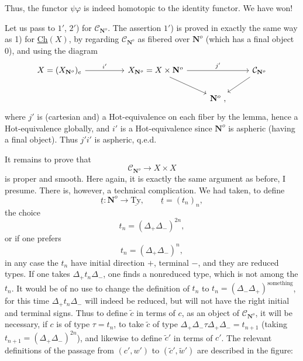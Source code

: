 \documentclass[11pt]{article}
\newcommand{\printedpage}[1]{\marginpar{\footnotesize p.~#1}}
\newcommand{\msp}[1]{\marginpar{\footnotesize [#1]}}
\newcommand{\CN}{\mathcal{C}_{\mathbf{N}^o}}
\begin{document}
\printedpage{104}
\msp{page 166}

Thus, the functor $\psi\varphi$ is indeed homotopic to the identity functor. We have won!

Let us pass to $1'$, $2'$) for $\CN$. The assertion $1'$) is proved in exactly the same way as 1) for \underline{Ch}$(X)$, by regarding $\CN$ as fibered over $\mathbf{N}^o$ (which has a final object 0), and using the diagram
\[
\begin{tikzcd}
X = (X_{\mathbf{N}^o})_e \arrow[rr, "i'"] & & X_{\mathbf{N}^o} = X \times \mathbf{N}^o \arrow[rr, "j'"] \arrow[dr] & & \mathcal{C}_{\mathbf{N}^o} \arrow[dl] \\
 & & & \mathbf{N}^o \ , &
\end{tikzcd}
\]
where $j'$ is (cartesian and) a Hot-equivalence on each fiber by the lemma, hence a Hot-equivalence globally, and $i'$ is a Hot-equivalence since $\mathbf{N}^o$ is aspheric (having a final object). Thus $j'i'$ is aspheric, q.e.d.

It remains to prove that
\[ \CN \longrightarrow X \times X \]
is proper and smooth. Here again,
\msp{page 167}
it is exactly the same argument as before, I presume. There is, however, a technical complication. We had taken, to define
\[ \underline{t} : \mathbf{N}^o \longrightarrow \underline{\mathrm{Ty}}, \qquad \underline{t} = (t_n)_n, \]
the choice
\[ t_n = (\Delta_+\Delta_-)^{2n}, \]
or if one prefers
\[ t_n = (\Delta_+\Delta_-)^n, \]
in any case the $t_n$ have initial direction $+$, terminal $-$, and they are reduced types. If one takes $\Delta_+t_n\Delta_-$, one finds a nonreduced type, which is not among the $t_n$. It would be of no use to change the definition of $t_n$ to $t_n = (\Delta_-\Delta_+)^{\text{something}}$, for this time $\Delta_+t_n\Delta_-$ will indeed be reduced, but will not have the right initial and terminal signs. Thus to define $\tilde{c}$ in terms of $c$, as an object of $\CN$, it will be necessary, if $c$ is of type $\tau = t_n$, to take $\tilde{c}$ of type $\Delta_+\Delta_-\tau\Delta_+\Delta_- = t_{n+1}$ (taking $t_{n+1} = (\Delta_+\Delta_-)^{2n}$), and likewise to define $\tilde{c}'$ in terms of $c'$. The relevant definitions of the passage from $(c',w')$ to $(\tilde{c}',\tilde{w}')$ are described in the figure: %

\msp{page 168}
\end{document}
